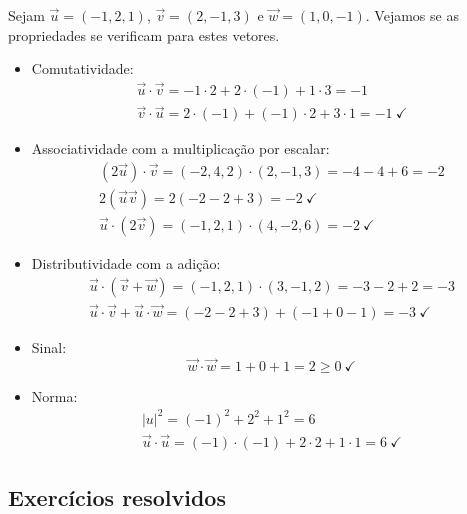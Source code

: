 \begin{ex}
  Sejam $\vec{u}=(-1,2,1)$, $\vec{v}=(2,-1,3)$ e $\vec{w}=(1,0,-1)$. Vejamos se as propriedades se verificam para estes vetores.
  \begin{itemize}
  \item Comutatividade:
    \begin{gather}
      \vec{u}\cdot\vec{v} = -1\cdot 2 + 2\cdot (-1) + 1\cdot 3 = -1\\
      \vec{v}\cdot\vec{u} = 2\cdot(-1) + (-1)\cdot 2 + 3\cdot 1 = -1~\checkmark
    \end{gather}
  \item Associatividade com a multiplicação por escalar:
    \begin{gather}
      (2\vec{u})\cdot\vec{v} = (-2,4,2)\cdot(2,-1,3) = -4-4+6=-2\\
      2(\vec{u}\vec{v}) = 2(-2-2+3) = -2~\checkmark\\
      \vec{u}\cdot(2\vec{v}) = (-1,2,1)\cdot(4,-2,6) = -2~\checkmark
    \end{gather}
  \item Distributividade com a adição:
    \begin{gather}
      \vec{u}\cdot(\vec{v}+\vec{w}) = (-1,2,1)\cdot(3,-1,2) = -3-2+2=-3\\
      \vec{u}\cdot\vec{v}+\vec{u}\cdot\vec{w} = (-2-2+3)+(-1+0-1) = -3~\checkmark
    \end{gather}
  \item Sinal:
    \begin{equation}
      \vec{w}\cdot\vec{w} = 1+0+1 = 2 \geq 0~\checkmark
    \end{equation}
  \item Norma:
    \begin{gather}
      |u|^2 = (-1)^2+2^2+1^2 = 6\\
      \vec{u}\cdot\vec{u} = (-1)\cdot(-1)+2\cdot 2+1\cdot 1 = 6~\checkmark
    \end{gather}
  \end{itemize}
\end{ex}

\subsection*{Exercícios resolvidos}

